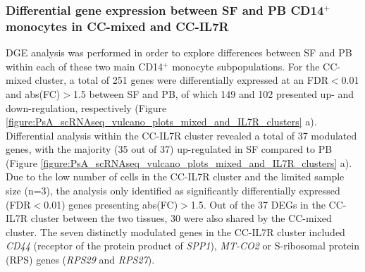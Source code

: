 \subsubsection{Differential gene expression between SF and PB CD14$^+$ monocytes in CC-mixed and CC-IL7R}
DGE analysis was performed in order to explore differences between SF and PB within each of these two main CD14$^+$ monocyte subpopulations. For the CC-mixed cluster, a total of 251 genes were differentially expressed at an FDR$<$0.01 and abs(FC)$>$1.5 between SF and PB, of which 149 and 102 presented up- and down-regulation, respectively (Figure \ref{figure:PsA_scRNAseq_vulcano_plots_mixed_and_IL7R_clusters} a). Differential analysis within the CC-IL7R cluster revealed a total of 37 modulated genes, with the majority (35 out of 37) up-regulated in SF compared to PB (Figure \ref{figure:PsA_scRNAseq_vulcano_plots_mixed_and_IL7R_clusters} a). Due to the low number of cells in the CC-IL7R cluster and the limited sample size (n=3), the analysis only identified as significantly differentially expressed (FDR$<$0.01) genes presenting abs(FC)$>$1.5. Out of the 37 DEGs in the CC-IL7R cluster between the two tissues, 30 were also shared by the CC-mixed cluster. The seven distinctly modulated genes in the CC-IL7R cluster included \textit{CD44} (receptor of the protein product of \textit{SPP1}), \textit{MT-CO2} or S-ribosomal protein (RPS) genes (\textit{RPS29} and \textit{RPS27}). 



